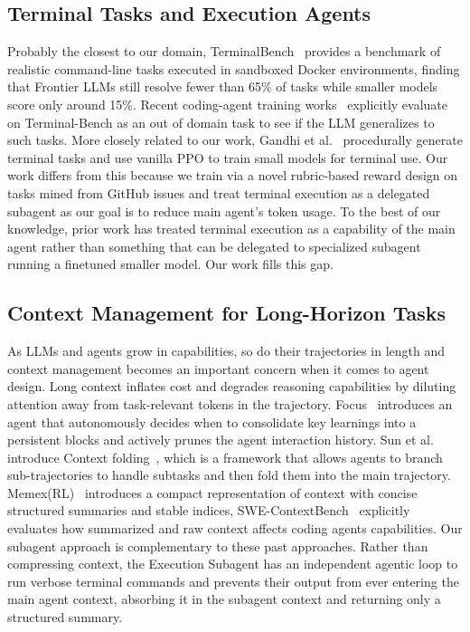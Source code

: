 \documentclass[sigconf,review]{acmart}
\begin{document}
\subsection{Terminal Tasks and Execution Agents}
Probably the closest to our domain, TerminalBench~\cite{terminal} provides a benchmark of realistic command-line tasks executed in sandboxed Docker environments, finding that Frontier LLMs still resolve fewer than 65\% of tasks while smaller models score only around 15\%. Recent coding-agent training works~\cite{qwencodernext, skyrlagent} explicitly evaluate on Terminal-Bench as an out of domain task to see if the LLM generalizes to such tasks. More closely related to our work, Gandhi et al.~\cite{endlessterminals} procedurally generate terminal tasks and use vanilla PPO to train small models for terminal use. Our work differs from this because we train via a novel rubric-based reward design on tasks mined from GitHub issues and treat terminal execution as a delegated subagent as our goal is to reduce main agent's token usage. To the best of our knowledge, prior work has treated terminal execution as a capability of the main agent rather than something that can be delegated to specialized subagent running a finetuned smaller model. Our work fills this gap.

\subsection{Context Management for Long-Horizon Tasks}
As LLMs and agents grow in capabilities, so do their trajectories in length and context management becomes an important concern when it comes to agent design. Long context inflates cost and degrades reasoning capabilities by diluting attention away from task-relevant tokens in the trajectory. Focus~\cite{focus} introduces an agent that autonomously decides when to consolidate key learnings into a persistent blocks and actively prunes the agent interaction history. Sun et al. introduce Context folding~\cite{contextfolding}, which is a framework that allows agents to branch sub-trajectories to handle subtasks and then fold them into the main trajectory. Memex(RL)~\cite{memex} introduces a compact representation of context with concise structured summaries and stable indices, SWE-ContextBench~\cite{swecontextbench} explicitly evaluates how summarized and raw context affects coding agents capabilities. Our subagent approach is complementary to these past approaches. Rather than compressing context, the Execution Subagent has an independent agentic loop to run verbose terminal commands and prevents their output from ever entering the main agent context, absorbing it in the subagent context and returning only a structured summary.
\end{document}
